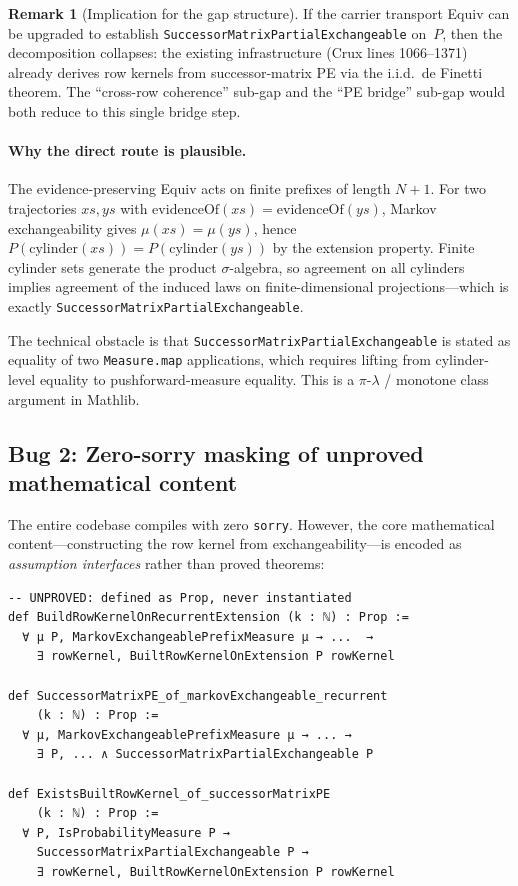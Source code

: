\documentclass[11pt]{article}
\theoremstyle{definition}
\newtheorem{remark}[theorem]{Remark}
\newcommand{\lean}[1]{\texttt{#1}}
\begin{document}
\begin{remark}[Implication for the gap structure]
If the carrier transport Equiv can be upgraded to establish
\lean{SuccessorMatrixPartialExchangeable} on~$P$, then the
decomposition collapses: the existing infrastructure (Crux lines 1066--1371)
already derives row kernels from successor-matrix PE via the
i.i.d.\ de Finetti theorem.  The ``cross-row coherence'' sub-gap and
the ``PE bridge'' sub-gap would both reduce to this single bridge step.
\end{remark}

\paragraph{Why the direct route is plausible.}
The evidence-preserving Equiv acts on finite prefixes of length $N{+}1$.
For two trajectories $xs, ys$ with $\mathrm{evidenceOf}(xs) =
\mathrm{evidenceOf}(ys)$, Markov exchangeability gives $\mu(xs) = \mu(ys)$,
hence $P(\mathrm{cylinder}(xs)) = P(\mathrm{cylinder}(ys))$ by the
extension property.  Finite cylinder sets generate the product
$\sigma$-algebra, so agreement on all cylinders implies agreement of the
induced laws on finite-dimensional projections---which is exactly
\lean{SuccessorMatrixPartialExchangeable}.

The technical obstacle is that
\lean{SuccessorMatrixPartialExchangeable} is stated as equality of
two \lean{Measure.map} applications, which requires lifting from
cylinder-level equality to pushforward-measure equality.  This
is a $\pi$-$\lambda$ / monotone class argument in Mathlib.

\subsection{Bug 2: Zero-sorry masking of unproved mathematical content}
\label{sec:bug2}

The entire codebase compiles with zero \texttt{sorry}.  However, the
core mathematical content---constructing the row kernel from
exchangeability---is encoded as \emph{assumption interfaces} rather
than proved theorems:

\begin{lstlisting}
-- UNPROVED: defined as Prop, never instantiated
def BuildRowKernelOnRecurrentExtension (k : ℕ) : Prop :=
  ∀ μ P, MarkovExchangeablePrefixMeasure μ → ...  →
    ∃ rowKernel, BuiltRowKernelOnExtension P rowKernel

def SuccessorMatrixPE_of_markovExchangeable_recurrent
    (k : ℕ) : Prop :=
  ∀ μ, MarkovExchangeablePrefixMeasure μ → ... →
    ∃ P, ... ∧ SuccessorMatrixPartialExchangeable P

def ExistsBuiltRowKernel_of_successorMatrixPE
    (k : ℕ) : Prop :=
  ∀ P, IsProbabilityMeasure P →
    SuccessorMatrixPartialExchangeable P →
    ∃ rowKernel, BuiltRowKernelOnExtension P rowKernel
\end{lstlisting}
\end{document}

